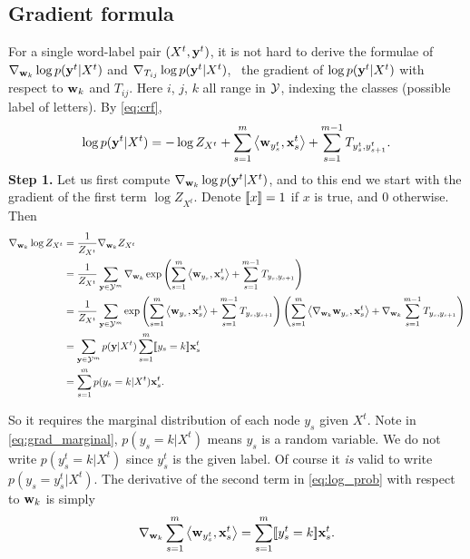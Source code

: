 \documentclass[11pt]{report}
\begin{document}
\subsection{Gradient formula}

For a single word-label pair $(X^t, \mathbf{\boldsymbol{y}}^t)$,
it is not hard to derive the formulae of ${\nabla}_{\mathbf{\boldsymbol{w}}_k} \log p(\mathbf{\boldsymbol{y}}^t|X^t)$ and ${\nabla}_{T_{ij}} \log p(\mathbf{\boldsymbol{y}}^t|X^t)$, \ie\ the gradient of $\log p(\mathbf{\boldsymbol{y}}^t|X^t)$ with respect to $\mathbf{\boldsymbol{w}}_k$ and $T_{ij}$.
Here $i$, $j$, $k$ all range in $\mathcal{Y}$, indexing the classes (possible label of letters).
By \eqref{eq:crf},
%
\begin{align}
\label{eq:log_prob}
  \log p(\mathbf{\boldsymbol{y}}^t | X^t) = -\log Z_{X^t} + \sum_{s=1}^m \left\langle \mathbf{\boldsymbol{w}}_{y_s^t},\mathbf{\boldsymbol{x}}^t_s \right\rangle + \sum_{s=1}^{m-1} T_{y_s^t, y_{s+1}^t}.
\end{align}
%
{\bf Step 1.} Let us first compute ${\nabla}_{\mathbf{\boldsymbol{w}}_k} \log p(\mathbf{\boldsymbol{y}}^t|X^t)$,
and to this end we start with the gradient of the first term $\log Z_{X^t}$.
Denote $[\![x]\!] = 1$ if $x$ is true, and 0 otherwise.
Then
%
\begin{align}
  {\nabla}_{\mathbf{\boldsymbol{w}}_k} \log Z_{X^t}
    &= \frac{1}{Z_{X^t}} {\nabla}_{\mathbf{\boldsymbol{w}}_k} Z_{X^t} \\
    &= \frac{1}{Z_{X^t}} \sum_{\mathbf{\boldsymbol{y}} \in \mathcal{Y}^m} {\nabla}_{\mathbf{\boldsymbol{w}}_k} \exp \left(\sum_{s=1}^m \left\langle \mathbf{\boldsymbol{w}}_{y_s},\mathbf{\boldsymbol{x}}^t_s \right\rangle + \sum_{s=1}^{m-1} T_{y_s, y_{s+1}}\right) \\
    &=\frac{1}{Z_{X^t}} \sum_{\mathbf{\boldsymbol{y}} \in \mathcal{Y}^m} \exp \left(\sum_{s=1}^m \left\langle \mathbf{\boldsymbol{w}}_{y_s},\mathbf{\boldsymbol{x}}^t_s \right\rangle + \sum_{s=1}^{m-1} T_{y_s, y_{s+1}}\right)
    \left(\sum_{s=1}^m \left\langle {\nabla}_{\mathbf{\boldsymbol{w}}_k} \mathbf{\boldsymbol{w}}_{y_s},\mathbf{\boldsymbol{x}}^t_s \right\rangle + {\nabla}_{\mathbf{\boldsymbol{w}}_k} \sum_{s=1}^{m-1} T_{y_s, y_{s+1}}\right) \\
    &= \sum_{\mathbf{\boldsymbol{y}} \in \mathcal{Y}^m} p(\mathbf{\boldsymbol{y}} | X^t) \sum_{s=1}^m [\![y_s = k]\!] \mathbf{\boldsymbol{x}}^t_s \\
\label{eq:grad_marginal}
    &= \sum_{s=1}^m p(y_s = k | X^t) \mathbf{\boldsymbol{x}}^t_s.
\end{align}

So it requires the marginal distribution of each node $y_s$ given $X^t$.
Note in \eqref{eq:grad_marginal}, $p(y_s = k | X^t)$ means $y_s$ is a random variable.
We do not write $p(y_s^t = k | X^t)$ since $y_s^t$ is the given label.
Of course it \emph{is} valid to write $p(y_s = y^t_s | X^t)$.
The derivative of the second term in \eqref{eq:log_prob} with respect to $\mathbf{\boldsymbol{w}}_k$ is simply
%
\begin{align}
  {\nabla}_{\mathbf{\boldsymbol{w}}_k} \sum_{s=1}^m \left\langle \mathbf{\boldsymbol{w}}_{y^t_s},\mathbf{\boldsymbol{x}}^t_s \right\rangle = \sum_{s=1}^m [\![y^t_s = k]\!] \mathbf{\boldsymbol{x}}^t_s.
\end{align}
\end{document}

